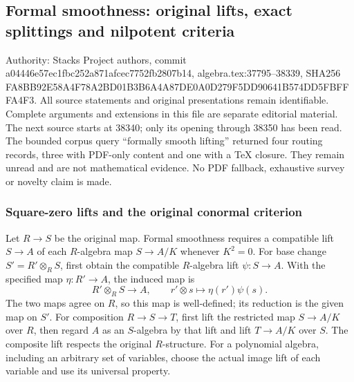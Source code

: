\subsection{Formal smoothness: original lifts, exact splittings and nilpotent criteria}\label{algebra-proof-048-formal-smoothness-original-lifts-exact-splittings-and-nilpotent-criteria}

Authority: Stacks Project authors, commit a044\allowbreak{}46e5\allowbreak{}7ec1\allowbreak{}fbc2\allowbreak{}52a8\allowbreak{}71af\allowbreak{}cec7\allowbreak{}752f\allowbreak{}b280\allowbreak{}7b14, algebra.\AlgebraIdentifierBreak{}tex:\AlgebraIdentifierBreak{}37795--\AlgebraIdentifierBreak{}38339, SHA256 FA8B\allowbreak{}B92E\allowbreak{}58A4\allowbreak{}F78A\allowbreak{}2BD0\allowbreak{}1B3B\allowbreak{}6A4A\allowbreak{}87DE\allowbreak{}0A0D\allowbreak{}279F\allowbreak{}5DD9\allowbreak{}0641\allowbreak{}B574\allowbreak{}DD5F\allowbreak{}BFFF\allowbreak{}A4F3. All source statements and original presentations remain identifiable. Complete arguments and extensions in this file are separate editorial material. The next source starts at 38340; only its opening through 38350 has been read. The bounded corpus query ``formally smooth lifting'' returned four routing records, three with PDF-only content and one with a TeX closure. They remain unread and are not mathematical evidence. No PDF fallback, exhaustive survey or novelty claim is made.

\subsubsection{Square-zero lifts and the original conormal criterion}\label{algebra-proof-048-square-zero-lifts-and-the-original-conormal-criterion}

Let \(R\to S\) be the original map. Formal smoothness requires a compatible lift \(S\to A\) of each \(R\)-algebra map \(S\to A/K\) whenever \(K^2=0\). For base change \(S'=R'\otimes_RS\), first obtain the compatible \(R\)-algebra lift \(\psi:S\to A\). With the specified map \(\eta:R'\to A\), the induced map is \[
R'\otimes_RS\longrightarrow A,\qquad r'\otimes s\longmapsto\eta(r')\psi(s).
\] The two maps agree on \(R\), so this map is well-defined; its reduction is the given map on \(S'\). For composition \(R\to S\to T\), first lift the restricted map \(S\to A/K\) over \(R\), then regard \(A\) as an \(S\)-algebra by that lift and lift \(T\to A/K\) over \(S\). The composite lift respects the original \(R\)-structure. For a polynomial algebra, including an arbitrary set of variables, choose the actual image lift of each variable and use its universal property.


